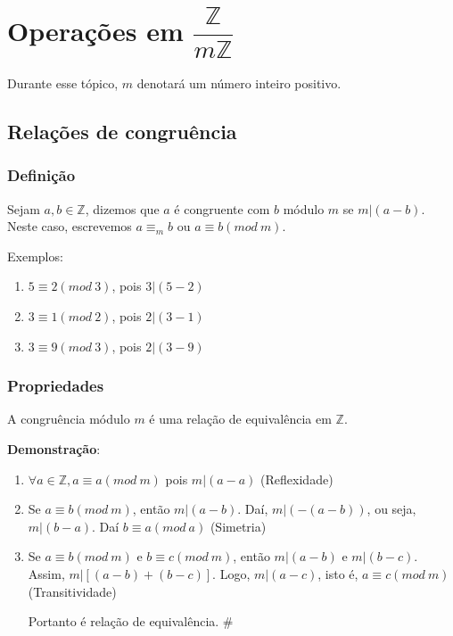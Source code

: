 \chapter{Operações em $\dfrac{\mathbb{Z}}{m\mathbb{Z}}$}

Durante esse tópico, $m$ denotará um número inteiro positivo.

\section{Relações de congruência}
\subsection{Definição}

\begin{definicao}[Congruência] Sejam $a,b\in\mathbb{Z}$, dizemos que $a$ é congruente com $b$ módulo $m$ se $m|(a-b)$. Neste caso, escrevemos $a\equiv_{m}b$ ou $a\equiv b(mod\ m)$.\end{definicao}

Exemplos:
\begin{enumerate}
\item $5\equiv 2(mod\ 3)$, pois $3|(5-2)$
\item $3\equiv 1(mod\ 2)$, pois $2|(3-1)$
\item $3\equiv 9(mod\ 3)$, pois $2|(3-9)$

\end{enumerate}
\subsection{Propriedades}
\begin{proposicao} A congruência módulo $m$ é uma relação de equivalência em $\mathbb{Z}$.\end{proposicao}

\textbf{Demonstração}:
\begin{enumerate}
\item $\forall a\in\mathbb{Z},a\equiv a(mod\ m)$ pois $m|(a-a)$ (Reflexidade)
\item Se $a\equiv b(mod\ m)$, então $m|(a-b)$. Daí, $m|(-(a-b))$, ou seja, $m|(b-a)$. Daí $b\equiv a(mod\ a)$ (Simetria)
\item Se $a\equiv b(mod\ m)$ e $b\equiv c(mod\ m)$, então $m|(a-b)$ e $m|(b-c)$. Assim, $m|[(a-b)+(b-c)]$. Logo, $m|(a-c)$, isto é, $a\equiv c(mod\ m)$ (Transitividade)

Portanto é relação de equivalência. \#

\end{enumerate}

